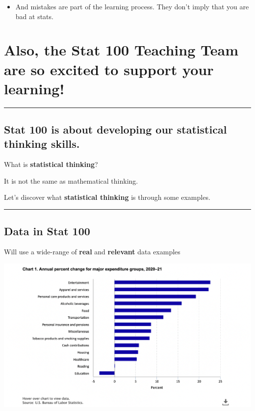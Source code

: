 \documentclass[
  letterpaper,
  DIV=11,
  numbers=noendperiod]{scrartcl}
\providecommand{\tightlist}{%
  \setlength{\itemsep}{0pt}\setlength{\parskip}{0pt}}\usepackage{longtable,booktabs,array}
\begin{document}
\hfill\break

\begin{itemize}
\tightlist
\item
  And mistakes are part of the learning process. They don't imply that
  you are bad at stats.
\end{itemize}

\hypertarget{also-the-stat-100-teaching-team-are-so-excited-to-support-your-learning}{%
\section{Also, the Stat 100 Teaching Team are so excited to support your
learning!}\label{also-the-stat-100-teaching-team-are-so-excited-to-support-your-learning}}

\begin{center}\rule{0.5\linewidth}{0.5pt}\end{center}

\hypertarget{stat-100-is-about-developing-our-statistical-thinking-skills.}{%
\subsection{\texorpdfstring{Stat 100 is about developing our
\textbf{statistical thinking}
skills.}{Stat 100 is about developing our statistical thinking skills.}}\label{stat-100-is-about-developing-our-statistical-thinking-skills.}}

What is \textbf{statistical thinking}?

It is not the same as mathematical thinking.

Let's discover what \textbf{statistical thinking} is through some
examples.

\begin{center}\rule{0.5\linewidth}{0.5pt}\end{center}

\hypertarget{data-in-stat-100}{%
\subsection{Data in Stat 100}\label{data-in-stat-100}}

Will use a wide-range of \textbf{real} and \textbf{relevant} data
examples

\includegraphics[width=1\textwidth,height=\textheight]{img/bls_ce_graph.png}
\end{document}
